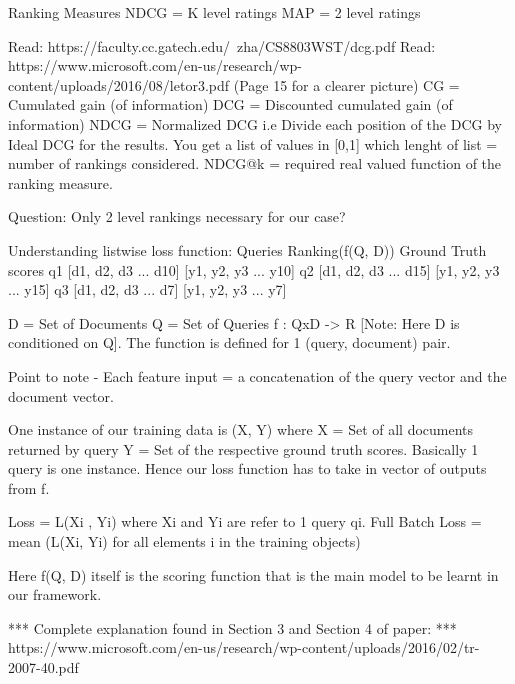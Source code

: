 \documentclass[12pt, twoside, ngerman]{report}
\begin{document}
Ranking Measures
    NDCG = K level ratings
    MAP = 2 level ratings

    Read: https://faculty.cc.gatech.edu/~zha/CS8803WST/dcg.pdf
    Read: https://www.microsoft.com/en-us/research/wp-content/uploads/2016/08/letor3.pdf (Page 15 for a clearer picture)
        CG = Cumulated gain (of information)
        DCG = Discounted cumulated gain (of information)
        NDCG = Normalized DCG i.e Divide each position of the DCG by Ideal DCG for the results.
               You get a list of values in [0,1] which lenght of list = number of rankings considered.
        NDCG@k = required real valued function of the ranking measure.

    Question: Only 2 level rankings necessary for our case?

Understanding listwise loss function:
    Queries       Ranking(f(Q, D))      Ground Truth scores
    q1        [d1, d2, d3 ... d10]      [y1, y2, y3 ... y10]
    q2        [d1, d2, d3 ... d15]      [y1, y2, y3 ... y15]
    q3        [d1, d2, d3 ... d7]       [y1, y2, y3 ... y7]

    D = {Set of Documents}
    Q = {Set of Queries}
    f : QxD -> R [Note: Here D is conditioned on Q]. The function is defined for 1 (query, document) pair.

    Point to note - Each feature input = a concatenation of the query vector and the document vector.

    One instance of our training data is (X, Y) where X = {Set of all documents returned by query} Y = {Set of the respective ground
    truth scores}. Basically 1 query is one instance. Hence our loss function has to take in vector of outputs from f.

    Loss = L(Xi , Yi) where Xi and Yi are refer to 1 query qi.
    Full Batch Loss = mean (L(Xi, Yi) for all elements i in the training objects)

    Here f(Q, D) itself is the scoring function that is the main model to be learnt in our framework.

    *** Complete explanation found in Section 3 and Section 4 of paper:
        *** https://www.microsoft.com/en-us/research/wp-content/uploads/2016/02/tr-2007-40.pdf
\end{document}
